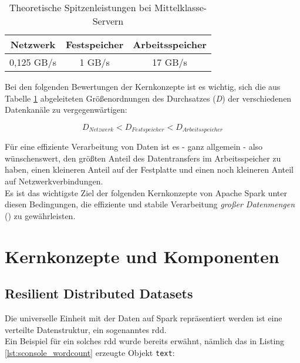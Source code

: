 \begin{table}[ht]
	\centering %
	\begin{tabular}{c c c} %
		\hline\hline %
		Netzwerk & Festspeicher & Arbeitsspeicher\\ [0.5ex] %
		\hline %
		0,125 GB/s & 1 GB/s & 17 GB/s \\ %
		\hline %
	\end{tabular}
	\caption{Theoretische Spitzenleistungen bei Mittelklasse-Servern} %
	\label{table:vgldurchsatz} %
\end{table}

Bei den folgenden Bewertungen der Kernkonzepte ist es wichtig, sich die aus Tabelle \ref{table:vgldurchsatz} abgeleiteten Größenordnungen des Durchsatzes (\textit{D}) der verschiedenen Datenkanäle zu vergegenwärtigen:

\begin{equation*}
	D_{Netzwerk} < D_{Festspeicher} < D_{Arbeitsspeicher}
\end{equation*}

Für eine effiziente Verarbeitung von Daten ist es - ganz allgemein - also wünschenswert, den größten Anteil des Datentransfers im Arbeitsspeicher zu haben, einen kleineren Anteil auf der Festplatte und einen noch kleineren Anteil auf Netzwerkverbindungen.\\

Es ist das wichtigste Ziel der folgenden Kernkonzepte von Apache Spark unter diesen Bedingungen, die effiziente und stabile Verarbeitung \textit{großer Datenmengen} (\cite{Sam14}) zu gewährleisten.\\

\section{Kernkonzepte und Komponenten}

\subsection{Resilient Distributed Datasets}
Die universelle Einheit mit der Daten auf Spark repräsentiert werden ist eine verteilte Datenstruktur, ein sogenanntes \gls{rdd}\cite{Mat12}.\\

Ein Beispiel für ein solches \gls{rdd} wurde bereits erwähnt, nämlich das in Listing \ref{lst:sconsole_wordcount} erzeugte Objekt \lstinline|text|:\\


